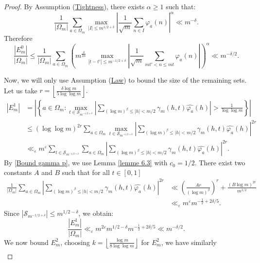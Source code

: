 \documentclass[12pt]{amsart}
\theoremstyle{definition}
\numberwithin{equation}{section}
\numberwithin{equation}{section}
\def\Scal{\mathcal{S}}
\begin{document}
\begin{proof} 

By Assumption (\hyperlink{Ass Tightness}{Tightness}), there exists $\alpha\geq 1$ such that:
\[
\frac{1}{|\Omega_m|}\sum_{a\in\Omega_m}
\max_{|I|\leq m^{1/2+\delta}}\left|
\frac{1}{\sqrt{m}}\sum_{n\in I} \varphi_a(n)
\right|^{\alpha } \ll
m^{-\delta}.
\]
Therefore
\begin{equation}\label{Fm/Omega <<}
\frac{|E^0_m|}{|\Omega_m|}
\leq  \frac{1}{|\Omega_m|} \sum_{a\in\Omega_m}\left( m^{\frac{\delta}{2\alpha}}
\max_{|t-t'|\leq m^{-1/2+\delta}}\left|
\frac{1}{\sqrt{m}}\sum_{mt' < n\leq mt} \varphi_a(n)
\right| \right)^\alpha
\ll m^{-\delta/2}.
\end{equation}
 

Now, we will only use Assumption (\hyperlink{Ass Law}{Law}) to bound the size of the remaining sets. Let us take $ r = \left\lfloor\frac{\delta \log m}{5\log\log m}\right\rfloor.$
\begin{align*}
| E^1_m| &= 
\left|\left\{ a \in  \Omega_m: \max _{t\in \Scal_{m^{-1/2+\delta}}} \left|\sum_{(\log m)^{\beta} \leq |h|< m/2} \gamma_m(h,t)\widehat{\varphi_a}(h)\right|> \frac{1}{\log\log m}\right\}\right|
\\
&\leq (\log\log m)^{2r}\sum_{a\in \Omega_m}
\max _{t\in \Scal_{m^{-1/2+\delta}}}\left|
\sum_{(\log m)^{\beta}\leq |h|< m/2}
\gamma_m(h,t)\widehat{\varphi_a}(h)
\right|^{2r} \\
&\ll_\varepsilon m^\varepsilon \sum_{t\in \Scal_{m^{-1/2+\delta}}}\sum_{a\in \Omega_m}
\left|
\sum_
{(\log m)^{\beta}\leq |h|< m/2}
\gamma_m(h,t)\widehat{\varphi_a}(h)
\right|^{2r}.
\end{align*}
By \eqref{Bound gamma p}, we use Lemma \ref{lemme 6.3} with $c_0=1/2$.
There exist two constants $A$ and $B$ such that for all $t\in [0,1]$
\begin{align*}
\frac{1}{|\Omega_m|}
\sum_{a\in \Omega_m}
\left|
\sum_
{(\log m)^{\beta}\leq |h|< m/2}
\gamma_m(h,t)\widehat{\varphi_a}(h)
\right|^{2r}
&\ll
\left(
\frac{A r}{(\log m)^{\beta}}
\right)^r
+\frac{(B\log m)^{2r}}{m^{1/2}}\\
&\ll_\varepsilon m^\varepsilon m^{-\frac{1}{2}+2\delta/5}.
\end{align*}
Since $|\Scal_{m^{-1/2+\delta}}|\leq m^{1/2-\delta} $, we obtain:
\[
\frac{|E^1_m|}{|\Omega_m|}
\ll_\varepsilon 
m^{2\varepsilon}
m^{1/2 -\delta}
m^{-\frac{1}{2}+2\delta/5}
\ll m^{-\delta/2}.
\]
We now bound $E_m^2$, choosing $k = \left\lfloor\frac{\log m }{8\log\log m} \right \rfloor$ for $E^2_m$, we have similarly
\begin{align*}

\end{align*}
\end{proof}
\end{document}
